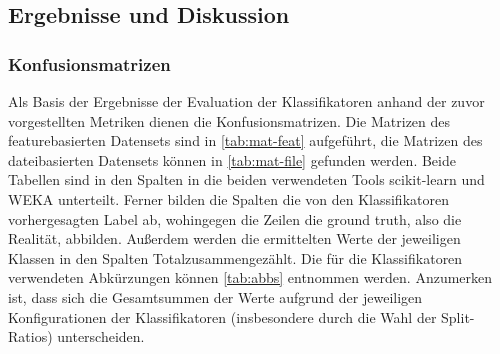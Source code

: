 \subsection{Ergebnisse und Diskussion}
\label{results}

\subsubsection*{Konfusionsmatrizen}

Als Basis der Ergebnisse der Evaluation der Klassifikatoren anhand der zuvor vorgestellten Metriken dienen die Konfusionsmatrizen. Die Matrizen des featurebasierten Datensets sind in \autoref{tab:mat-feat} aufgeführt, die Matrizen des dateibasierten Datensets können in \autoref{tab:mat-file} gefunden werden. Beide Tabellen sind in den Spalten in die beiden verwendeten Tools scikit-learn und WEKA unterteilt. Ferner bilden die Spalten die von den Klassifikatoren vorhergesagten Label ab, wohingegen die Zeilen die \glqq ground truth\grqq, also die Realität, abbilden. Außerdem werden die ermittelten Werte der jeweiligen Klassen in den Spalten \glqq Total\grqq zusammengezählt. Die für die Klassifikatoren verwendeten Abkürzungen können \autoref{tab:abbs} entnommen werden. Anzumerken ist, dass sich die Gesamtsummen der Werte aufgrund der jeweiligen Konfigurationen der Klassifikatoren (insbesondere durch die Wahl der Split-Ratios) unterscheiden.

